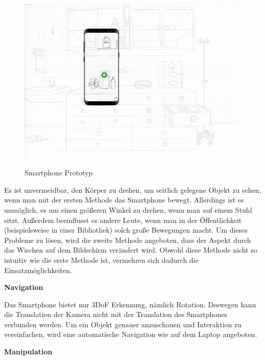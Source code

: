 \begin{figure}[ht]
\vspace*{1em}
\centering
\caption{Smartphone Prototyp}
\includegraphics[width=\textwidth]{images/paperPrototypewiths8mini.png}
\label{fig:paperPrototypewiths8mini} 
\end{figure}

  Es ist unvermeidbar, den Körper zu drehen, um seitlich gelegene Objekt zu sehen, wenn man mit der ersten Methode das Smartphone bewegt. Allerdings ist es unmöglich, es um einen größeren Winkel zu drehen, wenn man auf einem Stuhl sitzt. Außerdem beeinflusst es andere Leute, wenn man in der Öffentlichkeit (beispielsweise in einer Bibliothek) solch große Bewegungen macht. Um dieses Probleme zu lösen, wird die zweite Methode angeboten, dass der Aspekt durch das Wischen auf dem Bildschirm verändert wird. Obwohl diese Methode nicht so intuitiv wie die erste Methode ist, vermehren sich dadurch die Einsatzmöglichkeiten.
  
  \vspace{1em}
  \noindent
  \textbf{Navigation}
  \vspace{1em}
  
  \noindent
  Das Smartphone bietet nur 3DoF Erkennung, nämlich Rotation. Deswegen kann die Translation der Kamera nicht mit der Translation des Smartphones verbunden werden. Um ein Objekt genauer anzuschauen und Interaktion zu vereinfachen, wird eine automatische Navigation wie auf dem Laptop angeboten.
  
  \vspace{1em}
  \noindent
  \textbf{Manipulation}
  \vspace{1em}
  
